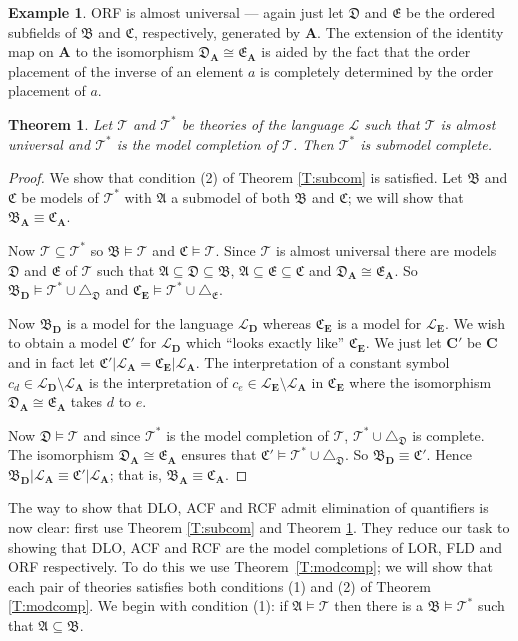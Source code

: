 \documentclass[titlepage, oneside]{amsbook}
\theoremstyle{plain}
\newtheorem{theorem}{Theorem}
\theoremstyle{definition}
\newtheorem{examples}{Example}
\theoremstyle{remark}
\newcommand{\amt}{\ensuremath{\mathfrak A \models \mathcal T }}
\newcommand{\bmt}{\ensuremath{\mathfrak B \models \mathcal T }}
\newcommand{\cmt}{\ensuremath{\mathfrak C \models \mathcal T }}
\newcommand{\tria}[1]{\ensuremath{\triangle_{\mathfrak{#1}}}}
\newcommand{\theory}{\ensuremath{\mathcal{T}}}
\newcommand{\tee}{\ensuremath{\mathcal{T}}}
\newcommand{\tst}{\ensuremath{\mathcal{T}^{\ast}}}
\newcommand{\tstar}{\ensuremath{\mathcal{T}^{\ast}}}
\newcommand{\lan}{\ensuremath{\mathcal{L}}}
\newcommand{\seq}{\ensuremath{\subseteq}}
\newcommand{\ma}{\ensuremath{\mathfrak{A}}}
\newcommand{\mb}{\ensuremath{\mathfrak{B}}}
\newcommand{\mc}{\ensuremath{\mathfrak{C}}}
\newcommand{\md}{\ensuremath{\mathfrak{D}}}
\newcommand{\me}{\ensuremath{\mathfrak{E}}}
\newcommand{\ba}{\ensuremath{\mathbf{A}}}
\newcommand{\bc}{\ensuremath{\mathbf{C}}}
\newcommand{\bd}{\ensuremath{\mathbf{D}}}
\newcommand{\be}{\ensuremath{\mathbf{E}}}
\begin{document}
\begin{examples} 
%
ORF is almost universal --- again just let $\md$ and $\me$
be the ordered subfields of $\mb$ and $\mc$, respectively, generated by
$\ba$.  The extension of the identity map on $\ba$ to the isomorphism
$\md_\ba \cong \me_\ba$ is aided by the fact that the order placement of
the inverse of an element $a$ is completely determined by the order
placement of $a$.
\end{examples}



\begin{theorem}\label{T:tstsubcom}
%
Let $\tee$ and $\tst$ be theories of the language $\lan$ such that 
$\tee$ is almost universal and $\tst$ is the model completion of $\tee$.
Then $\tst$ is submodel complete.
\end{theorem}

\begin{proof}  We show that condition (2) of Theorem \ref{T:subcom} is
satisfied.  Let $\mb$ and $\mc$ be models of $\tst$ with $\ma$ a
submodel of
both $\mb$ and $\mc$; we will show that $\mb_\ba \equiv \mc_\ba$.

Now $\theory \seq \tstar$ so $\bmt$ and $\cmt$.  Since $\tee$ is almost
universal there are models $\md$ and $\me$ of $\tee$ such that $\ma
\seq \md
\seq \mb$, $\ma \seq \me \seq \mc$ and $\md_\ba \cong \me_\ba$.  So
$\mb_\bd \models \tstar \cup \tria D$ and $\mc_\be \models \tstar \cup
\tria E$.

Now $\mb_\bd$ is a model for the language $\lan_\bd$ whereas $\mc_\be$
is
a model for $\lan_\be$.  We wish to obtain a model $\mc'$ for $\lan_\bd$
which ``looks exactly like'' $\mc_\be$.  We just let $\bc'$ be $\bc$
and in
fact let $\mc' | \lan_\ba = \mc_\be | \lan_\ba$.  The interpretation of a
constant symbol $c_d \in \lan_\bd \setminus \lan_\ba$ is the
interpretation of $c_e \in \lan_\be \setminus \lan_\ba$ in $\mc_\be$ where
the isomorphism $\md_\ba \cong \me_\ba$ takes $d$ to $e$.

Now $\md \models \theory$ and since $\tst$ is the model completion of
$\tee$,
$\theory^{\ast} \cup \tria D$ is complete.  The isomorphism $\md_\ba \cong
\me_\ba$ ensures that $\mc' \models \tstar \cup \tria D$.  So $\mb_\bd
\equiv \mc'$.  Hence $\mb_\bd | \lan_\ba \equiv \mc'| \lan_\ba$; that is,
$\mb_\ba \equiv \mc_\ba$.

\end{proof}

The way to show that DLO, ACF and RCF admit elimination of quantifiers is
now clear: first use Theorem \ref{T:subcom} and Theorem \ref{T:tstsubcom}. They reduce our task to showing that DLO, ACF and RCF are the model completions of LOR, FLD and ORF respectively.  
To do this we use Theorem~\ref{T:modcomp};
we will show that each pair of theories satisfies both conditions (1) 
and (2) of Theorem \ref{T:modcomp}.
We begin with condition (1): if $\amt$ then there is a $\mb \models
\tstar$ such that $\ma \seq \mb$.
\end{document}
